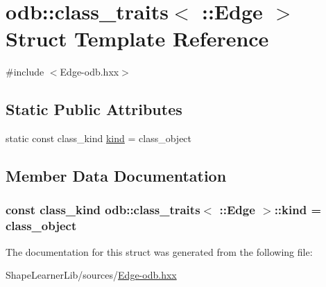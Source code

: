 \hypertarget{structodb_1_1class__traits_3_01_1_1_edge_01_4}{}\section{odb\+:\+:class\+\_\+traits$<$ \+:\+:Edge $>$ Struct Template Reference}
\label{structodb_1_1class__traits_3_01_1_1_edge_01_4}


{\ttfamily \#include $<$Edge-\/odb.\+hxx$>$}

\subsection*{Static Public Attributes}
\begin{DoxyCompactItemize}
\item 
static const class\+\_\+kind \hyperlink{structodb_1_1class__traits_3_01_1_1_edge_01_4_af441657df6cd9f62010d5beaa83997d7}{kind} = class\+\_\+object
\end{DoxyCompactItemize}


\subsection{Member Data Documentation}
\hypertarget{structodb_1_1class__traits_3_01_1_1_edge_01_4_af441657df6cd9f62010d5beaa83997d7}{}
\subsubsection[{kind}]{\setlength{\rightskip}{0pt plus 5cm}const class\+\_\+kind odb\+::class\+\_\+traits$<$ \+::{\bf Edge} $>$\+::kind = class\+\_\+object\hspace{0.3cm}{\ttfamily [static]}}\label{structodb_1_1class__traits_3_01_1_1_edge_01_4_af441657df6cd9f62010d5beaa83997d7}


The documentation for this struct was generated from the following file\+:\begin{DoxyCompactItemize}
\item 
Shape\+Learner\+Lib/sources/\hyperlink{_edge-odb_8hxx}{Edge-\/odb.\+hxx}\end{DoxyCompactItemize}
